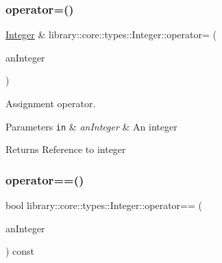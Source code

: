 \mbox{\label{classlibrary_1_1core_1_1types_1_1_integer_ab77cae94a9e6d4a405a555dd55763ea2}} 
\subsubsection{\texorpdfstring{operator=()}{operator=()}}
{\footnotesize\ttfamily \hyperlink{classlibrary_1_1core_1_1types_1_1_integer}{Integer} \& library\+::core\+::types\+::\+Integer\+::operator= (\begin{DoxyParamCaption}\item[{\hyperlink{classlibrary_1_1core_1_1types_1_1_integer_a623afb1580f870fd8a1997b1c12c917d}{Integer\+::\+Value\+Type}}]{an\+Integer }\end{DoxyParamCaption})}



Assignment operator. 


\begin{DoxyParams}[1]{Parameters}
\mbox{\tt in}  & {\em an\+Integer} & An integer \\
\hline
\end{DoxyParams}
\begin{DoxyReturn}{Returns}
Reference to integer 
\end{DoxyReturn}
\mbox{\label{classlibrary_1_1core_1_1types_1_1_integer_a52b3a012d6c6779773d051800daac516}} 
\subsubsection{\texorpdfstring{operator==()}{operator==()}\hspace{0.1cm}{\footnotesize\ttfamily [1/2]}}
{\footnotesize\ttfamily bool library\+::core\+::types\+::\+Integer\+::operator== (\begin{DoxyParamCaption}\item[{const \hyperlink{classlibrary_1_1core_1_1types_1_1_integer}{Integer} \&}]{an\+Integer }\end{DoxyParamCaption}) const}



